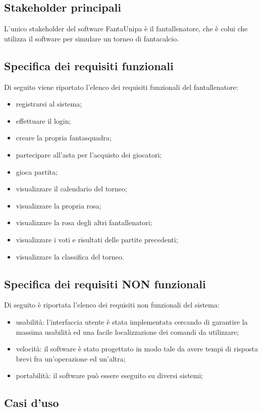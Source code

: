 \documentclass[12pt,a4paper]{article}
\begin{document}
\subsection{Stakeholder principali}
L'unico stakeholder del software FantaUnipa è il fantallenatore, che è colui che utilizza il software per simulare un torneo di fantacalcio. 
\subsection{Specifica dei requisiti funzionali}
Di seguito viene riportato l'elenco dei requisiti funzionali del fantallenatore:
\begin{itemize}
\item registrarsi al sistema;
\item effettuare il login;
\item creare la propria fantasquadra;
\item partecipare all'asta per l'acquisto dei giocatori;
\item gioca partita;
\item visualizzare il calendario del torneo;
\item visualizzare la propria rosa;
\item visualizzare la rosa degli altri fantallenatori;
\item visualizzare i voti e risultati delle partite precedenti;
\item visualizzare la classifica del torneo.
\end{itemize}
\subsection{Specifica dei requisiti NON funzionali}
Di seguito è riportata l'elenco dei requisiti non funzionali del sistema:
\begin{itemize}
\item usabilità: l'interfaccia utente è stata implementata cercando di garantire la massima usabilità ed una facile localizzazione dei comandi da utilizzare;
\item velocità: il software è stato progettato in modo tale da avere tempi di risposta brevi fra un'operazione ed un'altra;
\item portabilità: il software può essere eseguito su diversi sistemi;
\end{itemize}
\subsection{Casi d'uso}
\end{document}
